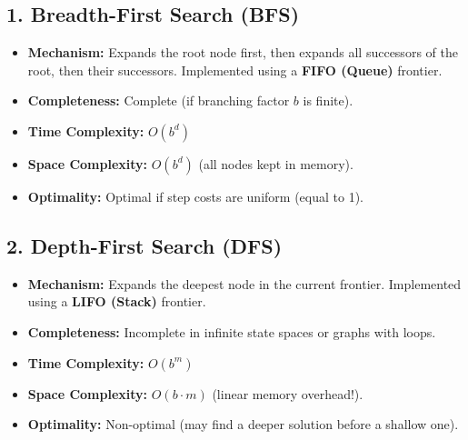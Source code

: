 \documentclass[12pt,a4paper]{article}
\begin{document}
\begin{tcolorbox}[tikzbox, title={Sample Search Tree Topology}]
\centering
{}
\end{tcolorbox}

\subsection{1. Breadth-First Search (BFS)}
\begin{itemize}[leftmargin=*, itemsep=3pt]
  \item \textbf{Mechanism:} Expands the root node first, then expands all successors of the root, then their successors. Implemented using a \textbf{FIFO (Queue)} frontier.
  \item \textbf{Completeness:} Complete (if branching factor $b$ is finite).
  \item \textbf{Time Complexity:} $O(b^d)$
  \item \textbf{Space Complexity:} $O(b^d)$ (all nodes kept in memory).
  \item \textbf{Optimality:} Optimal if step costs are uniform (equal to 1).
\end{itemize}

\subsection{2. Depth-First Search (DFS)}
\begin{itemize}[leftmargin=*, itemsep=3pt]
  \item \textbf{Mechanism:} Expands the deepest node in the current frontier. Implemented using a \textbf{LIFO (Stack)} frontier.
  \item \textbf{Completeness:} Incomplete in infinite state spaces or graphs with loops.
  \item \textbf{Time Complexity:} $O(b^m)$
  \item \textbf{Space Complexity:} $O(b \cdot m)$ (linear memory overhead!).
  \item \textbf{Optimality:} Non-optimal (may find a deeper solution before a shallow one).
\end{itemize}
\end{document}
